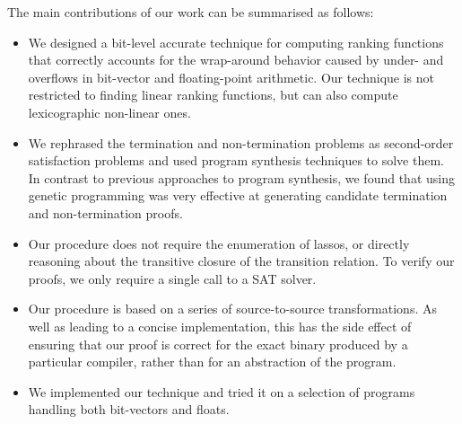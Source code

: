 \documentclass[preprint]{sigplanconf}
\theoremstyle{definition}
\begin{document}


The main contributions of our work can be summarised as follows:
%
\begin{itemize}

\item We designed a bit-level accurate technique for computing ranking
functions that correctly accounts for the wrap-around behavior caused by
under- and overflows in bit-vector and floating-point arithmetic.  Our
technique is not restricted to finding linear ranking functions, but can
also compute lexicographic non-linear ones.

\item  We rephrased the termination and non-termination problems as
second-order satisfaction problems and used program synthesis techniques to
solve them.  In contrast to previous approaches to program synthesis, we
found that using genetic programming was very effective at generating
candidate termination and non-termination proofs.

\item Our procedure does not require the enumeration of lassos, or directly
reasoning about the transitive closure of the transition relation.  To
verify our proofs, we only require a single call to a SAT solver.



\item Our procedure is based on a series of source-to-source
transformations.  As well as leading to a concise implementation, this has
the side effect of ensuring that our proof is correct for the exact binary
produced by a particular compiler, rather than for an abstraction of the
program.

\item We implemented our technique and tried it on a selection of programs
handling both bit-vectors and floats.


\end{itemize}
\end{document}
